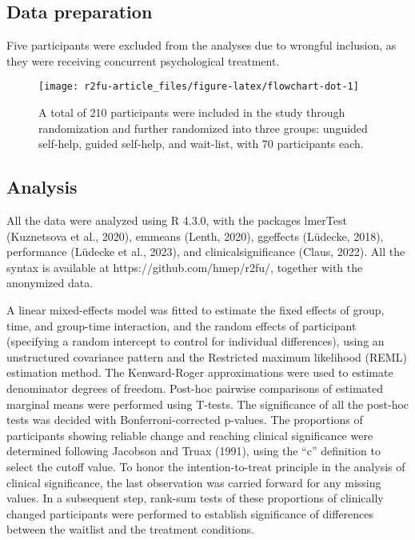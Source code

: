 \documentclass[3p]{elsarticle} %
\begin{document}
\hypertarget{data-preparation}{%
\subsection{Data preparation}\label{data-preparation}}

Five participants were excluded from the analyses due to wrongful
inclusion, as they were receiving concurrent psychological treatment.

\begin{figure}
\texttt{[image: r2fu-article\_files/figure-latex/flowchart-dot-1]} \caption{A total of 210 participants were included in the study through randomization and further randomized into three groups: unguided self-help, guided self-help, and wait-list, with 70 participants each.}\label{fig:flowchart-dot}
\end{figure}

\hypertarget{analysis}{%
\subsection{Analysis}\label{analysis}}

All the data were analyzed using R 4.3.0, with the packages lmerTest
(Kuznetsova et al., 2020), emmeans (Lenth, 2020), ggeffects (Lüdecke,
2018), performance (Lüdecke et al., 2023), and clinicalsignificance
(Claus, 2022). All the syntax is available at
https://github.com/hmep/r2fu/, together with the anonymized data.

A linear mixed-effects model was fitted to estimate the fixed effects of
group, time, and group-time interaction, and the random effects of
participant (specifying a random intercept to control for individual
differences), using an unstructured covariance pattern and the
Restricted maximum likelihood (REML) estimation method. The
Kenward-Roger approximations were used to estimate denominator degrees
of freedom. Post-hoc pairwise comparisons of estimated marginal means
were performed using T-tests. The significance of all the post-hoc tests
was decided with Bonferroni-corrected p-values. The proportions of
participants showing reliable change and reaching clinical significance
were determined following Jacobson and Truax (1991), using the ``c''
definition to select the cutoff value. To honor the intention-to-treat
principle in the analysis of clinical significance, the last observation
was carried forward for any missing values. In a subsequent step,
rank-sum tests of these proportions of clinically changed participants
were performed to establish significance of differences between the
waitlist and the treatment conditions.
\end{document}
